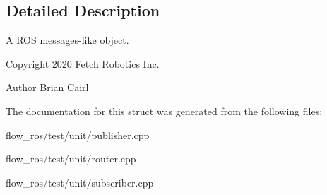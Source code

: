 \subsection{Detailed Description}
A R\+OS messages-\/like object. 

\begin{DoxyCopyright}{Copyright}
2020 Fetch Robotics Inc. 
\end{DoxyCopyright}
\begin{DoxyAuthor}{Author}
Brian Cairl 
\end{DoxyAuthor}


The documentation for this struct was generated from the following files\+:\begin{DoxyCompactItemize}
\item 
flow\+\_\+ros/test/unit/publisher.\+cpp\item 
flow\+\_\+ros/test/unit/router.\+cpp\item 
flow\+\_\+ros/test/unit/subscriber.\+cpp\end{DoxyCompactItemize}

